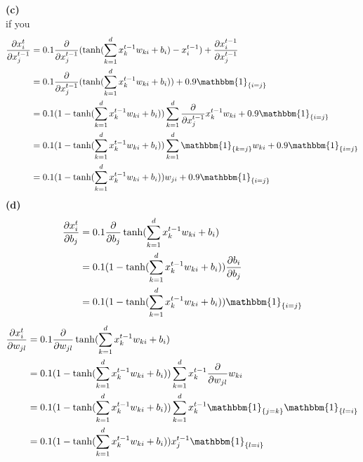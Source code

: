 \documentclass[a4paper]{article}
\newcommand{\1}{\mathds{1}}
\begin{document}
\textbf{(c)}\\if you
\begin{align*}
\frac{\partial x^t_i}{\partial x^{t-1}_j}
&=0.1\frac{\partial}{\partial x^{t-1}_j}(\tanh(\sum_{k=1}^{d}x^{t-1}_k w_{ki}+b_i)-x^{t-1}_i)+\frac{\partial x^{t-1}_i}{\partial x^{t-1}_j}\\
&=0.1\frac{\partial}{\partial x^{t-1}_j}(\tanh(\sum_{k=1}^{d}x^{t-1}_k w_{ki}+b_i))+0.9\mathbbm{1}_{\{i=j\}}\\
&=0.1(1-\tanh(\sum_{k=1}^{d}x^{t-1}_k w_{ki}+b_i))\sum_{k=1}^{d}\frac{\partial}{\partial x^{t-1}_j}x^{t-1}_k w_{ki}+0.9\mathbbm{1}_{\{i=j\}}\\
&=0.1(1-\tanh(\sum_{k=1}^{d}x^{t-1}_k w_{ki}+b_i))\sum_{k=1}^{d}\mathbbm{1}_{\{k=j\}} w_{ki}+0.9\mathbbm{1}_{\{i=j\}}\\
&=0.1(1-\tanh(\sum_{k=1}^{d}x^{t-1}_k w_{ki}+b_i))w_{ji}+0.9\mathbbm{1}_{\{i=j\}}\\
\end{align*}
\textbf{(d)}\\
\begin{align*}
\frac{\partial x^t_i}{\partial b_j}
&=0.1\frac{\partial}{\partial b_j}\tanh(\sum_{k=1}^{d}x^{t-1}_k w_{ki}+b_i)\\
&=0.1(1-\tanh(\sum_{k=1}^{d}x^{t-1}_k w_{ki}+b_i))\frac{\partial b_i}{\partial b_j}\\
&=0.1(1-\tanh(\sum_{k=1}^{d}x^{t-1}_k w_{ki}+b_i))\mathbbm{1}_{\{i=j\}}\\
\end{align*}
\begin{align*}
\frac{\partial x^t_i}{\partial w_{jl}}
&=0.1\frac{\partial}{\partial w_{jl}}\tanh(\sum_{k=1}^{d}x^{t-1}_k w_{ki}+b_i)\\
&=0.1(1-\tanh(\sum_{k=1}^{d}x^{t-1}_k w_{ki}+b_i))\sum_{k=1}^{d}x^{t-1}_k\frac{\partial}{\partial w_{jl}}w_{ki}\\
&=0.1(1-\tanh(\sum_{k=1}^{d}x^{t-1}_k w_{ki}+b_i))\sum_{k=1}^{d}x^{t-1}_k\mathbbm{1}_{\{j=k\}}\mathbbm{1}_{\{l=i\}}\\
&=0.1(1-\tanh(\sum_{k=1}^{d}x^{t-1}_k w_{ki}+b_i))x^{t-1}_j\mathbbm{1}_{\{l=i\}}\\
\end{align*}
\end{document}
